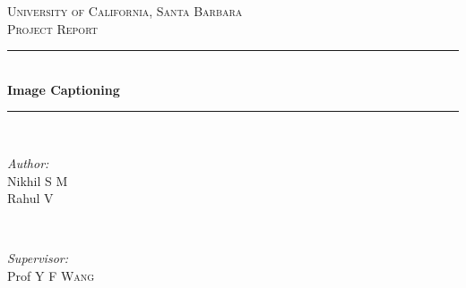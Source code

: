 \begin{titlepage}

\newcommand{\HRule}{\rule{\linewidth}{0.5mm}} %

\center %
 

\textsc{\LARGE University of California, Santa Barbara}\\[1cm] %
\textsc{\Large Project Report}\\[0.5cm] %


\HRule \\[0.4cm]
{ \huge \bfseries Image Captioning}\\[0.1cm] %
\HRule \\[1cm]
 

\begin{minipage}{0.4\textwidth}
\begin{flushleft} \large
\emph{Author:}\\
Nikhil \textsc{S M} \\
Rahul \textsc{V} %
\end{flushleft}
\end{minipage}
~
\begin{minipage}{0.4\textwidth}
\begin{flushright} \large
\emph{Supervisor:} \\
Prof Y F \textsc{Wang} %
\end{flushright}
\end{minipage}\\[2cm]



\end{titlepage}
